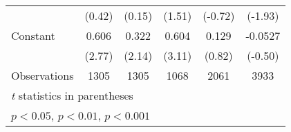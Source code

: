 \begin{table}[htbp]
\begin{tabular}{l*{5}{c}}
                                        &   (0.42)         &   (0.15)         &   (1.51)         &  (-0.72)         &  (-1.93)         \\
\addlinespace
Constant                                &    0.606\sym{**} &    0.322\sym{*}  &    0.604\sym{**} &    0.129         &  -0.0527         \\
                                        &   (2.77)         &   (2.14)         &   (3.11)         &   (0.82)         &  (-0.50)         \\
\midrule
Observations                            &     1305         &     1305         &     1068         &     2061         &     3933         \\
\bottomrule
\multicolumn{6}{l}{\footnotesize \textit{t} statistics in parentheses}\\
\multicolumn{6}{l}{\footnotesize \sym{*} \(p<0.05\), \sym{**} \(p<0.01\), \sym{***} \(p<0.001\)}\\
\end{tabular}
\end{table}
